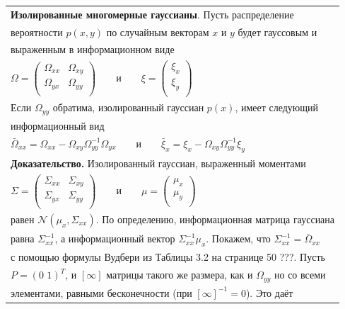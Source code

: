 \documentclass[10pt,a4paper]{article}
\begin{document}
\begin{table}[H]
\begin{center}
\begin{tabular}{|l|}
\hline
\textbf{Изолированные многомерные гауссианы}. Пусть распределение\\ вероятности $p(x,y)$ по случайным векторам $x$ и $y$ будет гауссовым и\\ выраженным в информационном виде\\
$\varOmega=\left(\begin{array}{cc}\varOmega_{xx}&\varOmega_{xy}\\\varOmega_{yx}&\varOmega_{yy}\\
\end{array} \right)\qquad\text{и}\qquad\xi=\left(\begin{array}{c}\xi_x\\\xi_y\\
\end{array} \right)$\\
Если $\varOmega_{yy}$ обратима, изолированный гауссиан $p(x)$, имеет следующий\\ информационный вид\\
$\bar{\varOmega}_{xx}=\varOmega_{xx}-\varOmega_{xy}\varOmega_{yy}^{-1}\varOmega_{yx}\qquad\text{и}\qquad\bar{\xi}_x=\xi_x-\varOmega_{xy}\varOmega_{yy}^{-1}\xi_y$\\
\textbf{Доказательство.} Изолированный гауссиан, выраженный
моментами\\
$\varSigma=\left(\begin{array}{cc}\varSigma_{xx}&\varSigma_{xy}\\\varSigma_{yx}&\varSigma_{yy}\\
\end{array} \right)\qquad\text{и}\qquad\mu=\left(\begin{array}{c}\mu_x\\\mu_y\\
\end{array} \right)$\\
равен $\mathcal{N}(\mu_x,\varSigma_{xx})$.  По определению, информационная матрица гауссиана\\ равна $\varSigma_{xx}^{-1}$, а информационный вектор $\varSigma_{xx}^{-1}\mu_x$.  Покажем, что $\varSigma_{xx}^{-1}=\bar{\varOmega}_{xx}$\\
с помощью формулы Вудбери из Таблицы 3.2 на странице 50 ???. Пусть\\ $P=(0\,\,1)^T$, и $[\infty]$ матрицы такого же размера, как и $\varOmega_{yy}$ но со всеми\\ элементами, равными бесконечности (при $[\infty]^{-1}=0$). Это даёт\\

\end{tabular}
\end{center}
\end{table}
\end{document}

